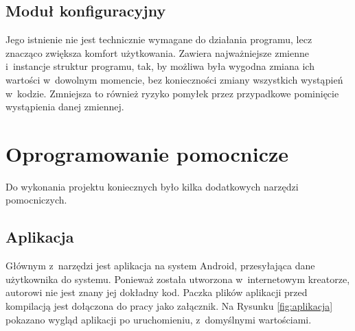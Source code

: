 \subsection*{Moduł konfiguracyjny}
Jego istnienie nie jest technicznie wymagane do działania programu, lecz znacząco zwiększa komfort użytkowania. Zawiera najważniejsze zmienne i~instancje struktur programu, tak, by możliwa była wygodna zmiana ich wartości w~dowolnym momencie, bez konieczności zmiany wszystkich wystąpień w~kodzie. Zmniejsza to również ryzyko pomyłek przez przypadkowe pominięcie wystąpienia danej zmiennej.

\section{Oprogramowanie pomocnicze}
Do wykonania projektu koniecznych było kilka dodatkowych narzędzi pomocniczych.

\subsection*{Aplikacja}
Głównym z~narzędzi jest aplikacja na system Android, przesyłająca dane użytkownika do systemu. Ponieważ została utworzona w~internetowym kreatorze, autorowi nie jest znany jej dokładny kod. Paczka plików aplikacji przed kompilacją jest dołączona do pracy jako załącznik. Na Rysunku \ref{fig:aplikacja} pokazano wygląd aplikacji po uruchomieniu, z~domyślnymi wartościami.

